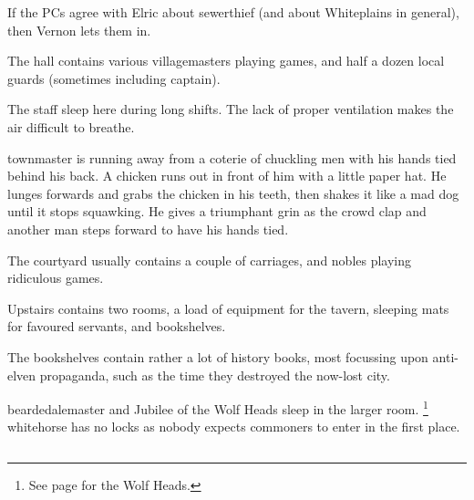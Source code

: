 \begin{multicols}{2}
If the PCs agree with Elric about \gls{sewerthief} (and about Whiteplains in general), then Vernon lets them in.

\label{horseHall}

The hall contains various villagemasters playing games, and half a dozen local guards (sometimes including \gls{captain}).


\label{horseKitch}

The staff sleep here during long shifts.  The lack of proper ventilation makes the air difficult to breathe.

\label{horseYard}

\begin{boxtext}

  \Gls{townmaster} is running away from a coterie of chuckling men with his hands tied behind his back.
   A chicken runs out in front of him with a little paper hat.
   He lunges forwards and grabs the chicken in his teeth, then shakes it like a mad dog until it stops squawking.
   He gives a triumphant grin as the crowd clap and another man steps forward to have his hands tied.

\end{boxtext}

The courtyard usually contains a couple of carriages, and nobles playing ridiculous games.

\label{horseUpstairs}

Upstairs contains two rooms, a load of equipment for the tavern, sleeping mats for favoured servants, and bookshelves.

The bookshelves contain rather a lot of history books, most focussing upon anti-elven propaganda, such as the time they destroyed the now-lost city.

\Gls{beardedalemaster} and Jubilee of the Wolf Heads sleep in the larger room.%
\footnote{See page \pageref{wolfHeads} for the Wolf Heads.}
\Gls{whitehorse} has no locks as nobody expects commoners to enter in the first place.
 

\subsection{}


\end{multicols}
